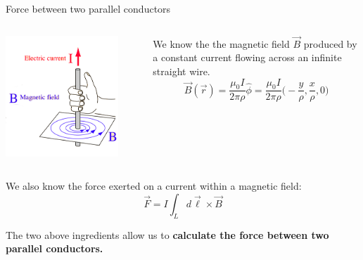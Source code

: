 %
%
%

\begin{frame}{Force between two parallel conductors}

\begin{columns}
  \begin{column}{0.40\textwidth}
    \includegraphics[width=0.85\textwidth]{./images/schematics/magnetic_field_around_wire_01.png}
  \end{column}
  \begin{column}{0.60\textwidth}
      We know the the magnetic field
      $\vec{B}$ produced by a constant current flowing across an infinite straight wire.
      \begin{equation*}
         \vec{B}(\vec{r})
             = \frac{\mu_0I}{2\pi \rho} \hat\phi
             = \frac{\mu_0I}{2\pi \rho} \Big( -\frac{y}{\rho}, \frac{x}{\rho}, 0 \Big)
     \end{equation*}
  \end{column}
\end{columns}

\vspace{0.2cm}

We also know the force exerted on a current within a magnetic field:
\begin{equation*}
  \vec{F} = I \int_{L} d\vec{\ell} \times \vec{B}
\end{equation*}

\vspace{0.1cm}

The two above ingredients allow us to
{\bf calculate the force between two parallel conductors.}\\

\end{frame}


